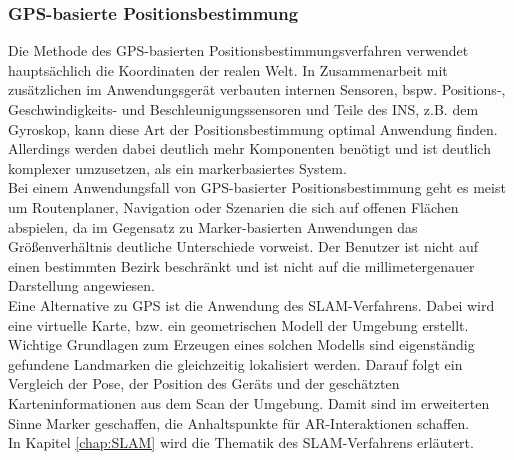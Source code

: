 \subsubsection*{\acs{GPS}-basierte Positionsbestimmung}
Die Methode des \acs{GPS}-basierten Positionsbestimmungsverfahren verwendet hauptsächlich die Koordinaten der realen Welt. In Zusammenarbeit 
mit zusätzlichen im Anwendungsgerät verbauten internen Sensoren, bspw. Positions-, Geschwindigkeits- und Beschleunigungssensoren und Teile des 
\ac{INS}, z.B. dem Gyroskop, kann diese Art der Positionsbestimmung optimal Anwendung finden. Allerdings werden dabei deutlich mehr Komponenten
benötigt und ist deutlich komplexer umzusetzen, als ein markerbasiertes System. 
\\ 
Bei einem Anwendungsfall von \acs{GPS}-basierter Positionsbestimmung geht es meist um Routenplaner, Navigation oder Szenarien die sich 
auf offenen Flächen abspielen, da im Gegensatz zu Marker-basierten Anwendungen das Größenverhältnis deutliche Unterschiede vorweist. 
Der Benutzer ist nicht auf einen bestimmten Bezirk beschränkt und ist nicht auf die millimetergenauer Darstellung angewiesen.
\\ 
\linebreak
Eine Alternative zu \acs{GPS} ist die Anwendung des \acs{SLAM}-Verfahrens. Dabei wird eine virtuelle Karte, bzw. ein geometrischen Modell der 
Umgebung erstellt. Wichtige Grundlagen zum Erzeugen eines solchen Modells sind eigenständig gefundene Landmarken die gleichzeitig 
lokalisiert werden. Darauf folgt ein Vergleich der Pose, der Position des Geräts und der geschätzten Karteninformationen aus dem Scan der 
Umgebung. 
Damit sind im erweiterten Sinne Marker geschaffen, die Anhaltspunkte für \acl{AR}-Interaktionen schaffen.
\\ 
In Kapitel \ref{chap:SLAM} wird die Thematik des \acs{SLAM}-Verfahrens erläutert. 

